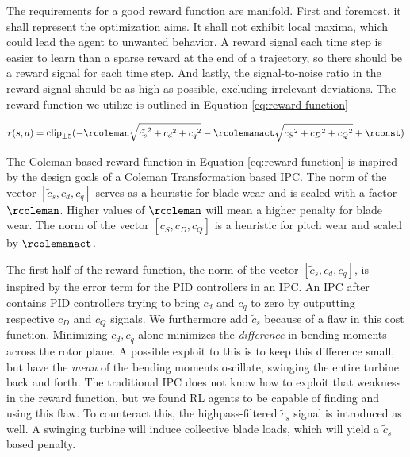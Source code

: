 The requirements for a good reward function are manifold. First and foremost, it shall represent the optimization aims. It shall not exhibit local maxima, which could lead the agent to unwanted behavior. A reward signal each time step is easier to learn than a sparse reward at the end of a trajectory, so there should be a reward signal for each time step. And lastly, the signal-to-noise ratio in the reward signal should be as high as possible, excluding irrelevant deviations. The reward function we utilize is outlined in Equation \ref{eq:reward-function}

\begin{equation}
  r(s,a) = \text{clip}_{\pm 5}(-\rcoleman \sqrt{\tilde{c_s}^2 + {c_d}^2 + {c_q}^2} - \rcolemanact \sqrt{{c_S}^2 + {c_D}^2 + {c_Q}^2} + \rconst)
  \label{eq:reward-function}
\end{equation}

The Coleman based reward function in Equation \ref{eq:reward-function} is inspired by the design goals of a Coleman Transformation based \ac{IPC}. The norm of the vector $[\tilde c_s, c_d, c_q]$ serves as a heuristic for blade wear and is scaled with a factor $\rcoleman$. Higher values of $\rcoleman$ will mean a higher penalty for blade wear. The norm of the vector $[c_S, c_D, c_Q]$ is a heuristic for pitch wear and scaled by $\rcolemanact$. 

The first half of the reward function, the norm of the vector $[\tilde c_s, c_d, c_q]$, is inspired by the error term for the PID controllers in an IPC. An \ac{IPC} after \citet{bossanyiFurtherLoadReductions2005} contains PID controllers trying to bring $c_d$ and $c_q$ to zero by outputting respective $c_D$ and $c_Q$ signals. We furthermore add $\tilde c_s$ because of a flaw in this cost function. Minimizing $c_d, c_q$ alone minimizes the \textit{difference} in bending moments across the rotor plane. A possible exploit to this is to keep this difference small, but have the \textit{mean} of the bending moments oscillate, swinging the entire turbine back and forth. The traditional \ac{IPC} does not know how to exploit that weakness in the reward function, but we found RL agents to be capable of finding and using this flaw. To counteract this, the highpass-filtered $\tilde c_s$ signal is introduced as well. A swinging turbine will induce collective blade loads, which will yield a $\tilde c_s$ based penalty.

